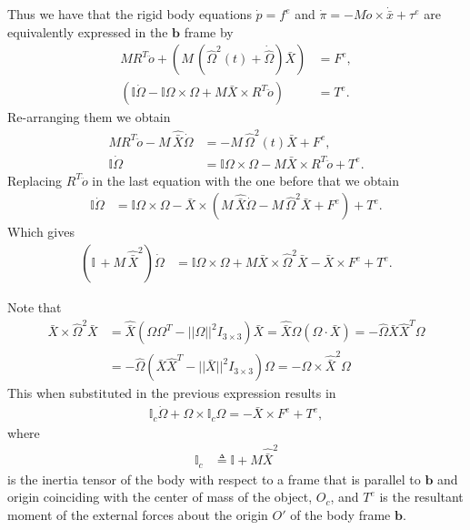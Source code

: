 \documentclass[graybox,envcountchap,sectrefs]{svmonoMuga}
\begin{document}
Thus we have that the rigid body equations $\dot{p}=f^e$ and $\dot{\pi}=-M\dot{o}\times \dot{\bar{x}}+ \tau^e$ are equivalently expressed in the $\mathbf{b}$ frame by
\begin{align}
MR^T\ddot{o}+\left(M\,\left(\widehat{\Omega}^2(t) +\dot{\widehat{\Omega}}\right)\bar{X}\right)&= F^e,\\
\left(\mathbb{I}\dot{\Omega}-\mathbb{I}{\Omega}\times \Omega+M\bar{X}\times R^T\ddot{o}\right)&=T^e.
\end{align}
Re-arranging them we obtain
\begin{align}
MR^T\ddot{o}-M\,\widehat{\bar{X}}\dot{\Omega}&= -M\,\widehat{\Omega}^2(t) \bar{X} + F^e,\\
\mathbb{I}\dot{\Omega}&=\mathbb{I}{\Omega}\times \Omega-M\bar{X}\times R^T\ddot{o}+T^e.
\end{align}
Replacing $R^T\ddot{o}$ in the last equation with the one before that we obtain
\begin{align}
\mathbb{I}\dot{\Omega}&=\mathbb{I}{\Omega}\times \Omega-\bar{X}\times \left(M\,\widehat{\bar{X}}\dot{\Omega}-M\,\widehat{\Omega}^2 \bar{X} + F^e\right)+T^e.
\end{align}
Which gives
\begin{align}
(\mathbb{I}\,+M\,\widehat{\bar{X}}^2)\dot{\Omega}&=\mathbb{I}{\Omega}\times \Omega+M\bar{X}\times \widehat{\Omega}^2 \bar{X} - \bar{X}\times F^e+T^e.
\end{align}

Note that 
\begin{align*}
\bar{X}\times \widehat{\Omega}^2\bar{X}&=\widehat{\bar{X}}\left(\Omega\Omega^T-||\Omega||^2I_{3\times 3}\right)\bar{X}=\widehat{\bar{X}}\Omega(\Omega\cdot \bar{X})=-\widehat{\Omega}\bar{X}\widehat{X}^T\Omega\\
&=-\widehat{\Omega}\left(\bar{X}\widehat{X}^T-||\bar{X}||^2I_{3\times 3}\right)\Omega=-\Omega\times \widehat{\bar{X}}^2\Omega
\end{align*}
This when substituted in the previous expression results in
\begin{align}
\mathbb{I}_c\dot{\Omega}+\Omega \times \mathbb{I}_c{\Omega}=-\bar{X}\times F^e+T^e,
\end{align}
where 
\begin{align*}
\mathbb{I}_c&\triangleq \mathbb{I}+M\widehat{\bar{X}}^2
\end{align*} 
is the inertia tensor of the body with respect to a frame that is parallel to $\mathbf{b}$ and origin coinciding with the center of mass of the object, $O_c$, and $T^e$ is the resultant moment of the external forces about the origin $O'$ of the body frame $\mathbf{b}$. 
\end{document}
